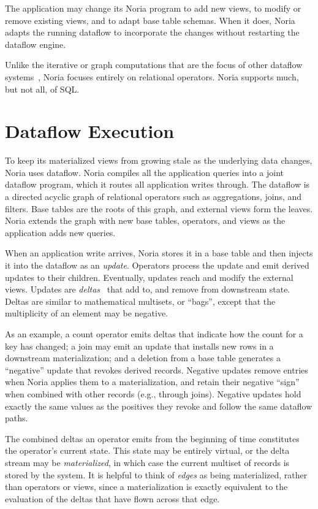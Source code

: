 The application may change its Noria program to add new views, to modify or
remove existing views, and to adapt base table schemas. When it does, Noria
adapts the running dataflow to incorporate the changes without restarting the
dataflow engine.

Unlike the iterative or graph computations that are the focus of other dataflow
systems~\cite{naiad, differential-dataflow}, Noria focuses entirely on
relational operators. Noria supports much, but not all, of SQL.

\section{Dataflow Execution}

To keep its materialized views from growing stale as the underlying data
changes, Noria uses dataflow. Noria compiles all the application queries into a
joint dataflow program, which it routes all application writes through. The
dataflow is a directed acyclic graph of relational operators such as
aggregations, joins, and filters. Base tables are the roots of this graph, and
external views form the leaves. Noria extends the graph with new base tables,
operators, and views as the application adds new queries.

When an application write arrives, Noria stores it in a base table and then
injects it into the dataflow as an \emph{update}. Operators process the update
and emit derived updates to their children. Eventually, updates reach and modify
the external views. Updates are \emph{deltas}~\cite{roll, differential-dataflow}
that add to, and remove from downstream state. Deltas are similar to
mathematical multisets, or ``bags'', except that the multiplicity of an element
may be negative.

As an example, a count operator emits deltas that indicate how the count for a
key has changed; a join may emit an update that installs new rows in a
downstream materialization; and a deletion from a base table generates a
``negative'' update that revokes derived records. Negative updates remove
entries when Noria applies them to a materialization, and retain their negative
``sign'' when combined with other records (e.g., through joins). Negative
updates hold exactly the same values as the positives they revoke and follow the
same dataflow paths.

The combined deltas an operator emits from the beginning of time constitutes the
operator's current state. This state may be entirely virtual, or the delta
stream may be \textit{materialized}, in which case the current multiset of
records is stored by the system. It is helpful to think of \emph{edges} as being
materialized, rather than operators or views, since a materialization is exactly
equivalent to the evaluation of the deltas that have flown across that edge.

